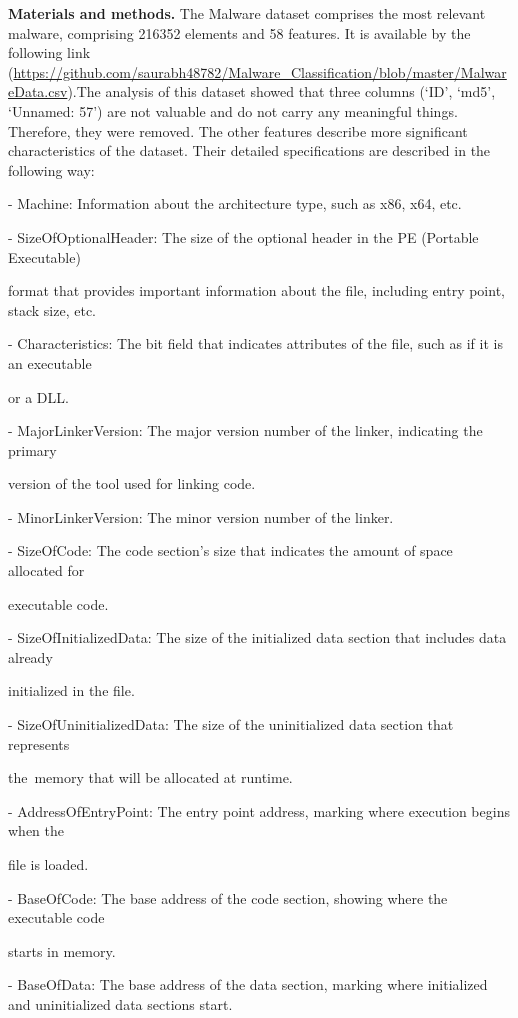 \begin{multicols}{2}
{\bfseries Materials and methods.} The Malware dataset comprises the most
relevant malware, comprising 216352 elements and 58 features. It is
available by the following link
(\url{https://github.com/saurabh48782/Malware_Classification/blob/master/MalwareData.csv}).The
analysis of this dataset showed that three columns (`ID', `md5',
`Unnamed: 57') are not valuable and do not carry any meaningful things.
Therefore, they were removed. The other features describe more
significant characteristics of the dataset. Their detailed
specifications are described in the following way:

- Machine: Information about the architecture type, such as x86, x64,
etc.

- SizeOfOptionalHeader: The size of the optional header in the PE
(Portable Executable)

format that provides important information about the file, including
entry point, stack size, etc.

- Characteristics: The bit field that indicates attributes of the file,
such as if it is an executable

or a DLL.

- MajorLinkerVersion: The major version number of the linker, indicating
the primary

version of the tool used for linking code.

- MinorLinkerVersion: The minor version number of the linker.

- SizeOfCode: The code section's size that indicates the amount of space
allocated for

executable code.

- SizeOfInitializedData: The size of the initialized data section that
includes data already

initialized in the file.

- SizeOfUninitializedData: The size of the uninitialized data section
that represents

the~memory that will be allocated at runtime.

- AddressOfEntryPoint: The entry point address, marking where execution
begins when the

file is loaded.

- BaseOfCode: The base address of the code section, showing where the
executable code

starts in memory.

- BaseOfData: The base address of the data section, marking where
initialized and uninitialized data sections start.


\end{multicols}
